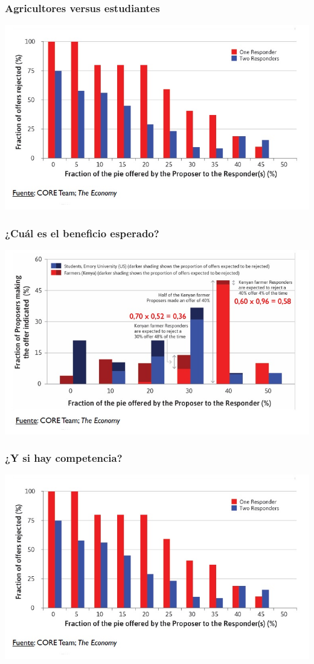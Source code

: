 \documentclass{beamer}
\begin{document}
\begin{frame}
\frametitle{ Agricultores versus estudiantes}
\centering
\includegraphics[scale=0.6]{Figures/Tema_03_32_ultimatum.jpg}
\end{frame}

\begin{frame}
\frametitle{ ¿Cuál es el beneficio esperado?}
\centering
\includegraphics[scale=0.6]{Figures/Tema_03_31_ultimatum.jpg}
\end{frame}

\begin{frame}
\frametitle{ ¿Y si hay competencia?}
\centering
\includegraphics[scale=0.6]{Figures/Tema_03_32_ultimatum.jpg}
\end{frame}
\end{document}
